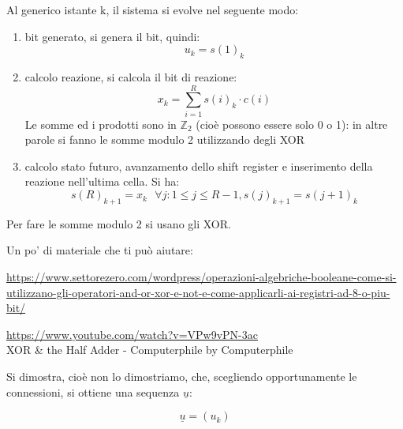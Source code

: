 Al generico istante k, 
il sistema si evolve nel seguente modo: 

\begin{enumerate}
    \item bit generato, si genera il bit, quindi: 
    {
        \Large 
        \begin{equation}
            u_k = s(1)_k
        \end{equation}
    }
    \item calcolo reazione, si calcola il bit di reazione: 
    {
        \Large 
        \begin{equation}
            x_k 
            =
            \sum_{i = 1}^{R}
            s(i)_k \cdot c(i)
        \end{equation}
    }
    Le somme ed i prodotti sono in $\mathbb{Z}_2$ (cioè possono essere solo 0 o 1): 
    in altre parole si fanno le somme modulo 2 utilizzando degli XOR
    \item calcolo stato futuro, avanzamento dello shift register e inserimento della reazione nell'ultima cella. \newline 
    Si ha:
    {
        \Large 
        \begin{equation}
            s(R)_{k+ 1} = x_k 
            \text{ }
            \forall j : 1 \le j \le R-1, s(j)_{k+1} = s(j+1)_k 
        \end{equation}
    }  
\end{enumerate}


\begin{tcolorbox}
    Per fare le somme modulo 2 si usano gli XOR. \newline 

    Un po' di materiale che ti può aiutare: \newline 

    \url{https://www.settorezero.com/wordpress/operazioni-algebriche-booleane-come-si-utilizzano-gli-operatori-and-or-xor-e-not-e-come-applicarli-ai-registri-ad-8-o-piu-bit/} \newline 

    \url{https://www.youtube.com/watch?v=VPw9vPN-3ac} \\
    XOR \& the Half Adder - Computerphile by Computerphile 
\end{tcolorbox}

Si dimostra, cioè non lo dimostriamo, che, scegliendo opportunamente le connessioni, 
si ottiene una sequenza $\underline{u}$: 

{
    \Large 
    \begin{equation}
        \underline{u} = (u_k)
    \end{equation}
}

